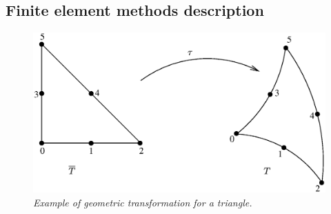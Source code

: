 \documentclass[11pt,a4paper]{article}
\begin{document}
\subsection{Finite element methods description}

\begin{figure}[H]
  \begin{center} 
    \includegraphics[width=12cm,angle=0]{getfemlist_extrans.eps}
    \caption{ \it Example of geometric transformation for a triangle.} \label{fig:extrans}
  \end{center}
\end{figure}
\end{document}
